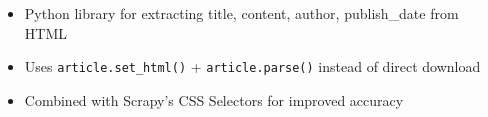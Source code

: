 \begin{itemize}
  \begin{itemize}
  \tightlist
  \item
    Python library for extracting title, content, author, publish\_date
    from HTML
  \item
    Uses \texttt{article.set\_html()} + \texttt{article.parse()} instead
    of direct download
  \item
    Combined with Scrapy's CSS Selectors for improved accuracy
  \end{itemize}
\end{itemize}

